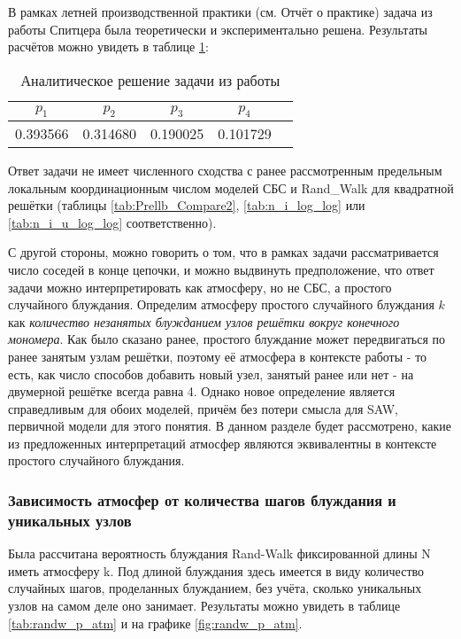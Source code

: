 В рамках летней производственной практики (см. Отчёт о практике) задача из работы Спитцера была теоретически и экспериментально решена. 
Результаты расчётов можно увидеть в таблице \ref{tab:Spitser_res}:

\begin{table}[h]
	\centering
	\begin{tabular}{|c|c|c|c|c|}
	\hline
	$p_1$ &  $p_2$ & $p_3$ &  $p_4$ \\ \hline
 	0.393566 & 0.314680 & 0.190025 & 0.101729 \\ \hline
	\end{tabular}
	\caption{Аналитическое решение задачи из работы  \cite{Spitser1969}}
	\label{tab:Spitser_res}
\end{table}

Ответ задачи не имеет численного сходства с ранее рассмотренным предельным локальным координационным числом моделей СБС и Rand\_Walk для квадратной решётки (таблицы \ref{tab:Prellb_Compare2}, \ref{tab:n_i_log_log} или \ref{tab:n_i_u_log_log} соответственно).

С другой стороны, можно говорить о том, что в рамках задачи рассматривается число соседей в конце цепочки, и можно выдвинуть предположение,
что ответ задачи можно интерпретировать как атмосферу, но не СБС, а простого случайного блуждания. 
Определим атмосферу простого случайного блуждания $k$ как \textit{количество незанятых блужданием узлов решётки вокруг конечного мономера}.
Как было сказано ранее, простого блуждание может передвигаться по ранее занятым узлам решётки, поэтому её атмосфера в контексте работы \cite{owczarek2008scaling}
 - то есть, как число способов добавить новый узел, занятый ранее или нет - на двумерной решётке всегда равна 4. 
Однако новое определение является справедливым для обоих моделей, причём без потери смысла для SAW, первичной модели для этого понятия.
В данном разделе будет рассмотрено, какие из предложенных интерпретаций атмосфер являются эквивалентны в контексте простого случайного блуждания.

\subsubsection{Зависимость атмосфер от количества шагов блуждания и уникальных узлов}

Была рассчитана вероятность блуждания Rand-Walk фиксированной длины N иметь атмосферу k. 
Под длиной блуждания здесь имеется в виду количество случайных шагов, проделанных блужданием, без учёта, сколько уникальных узлов на самом деле оно занимает.
Результаты можно увидеть в таблице \ref{tab:randw_p_atm} и на графике \ref{fig:randw_p_atm}.


